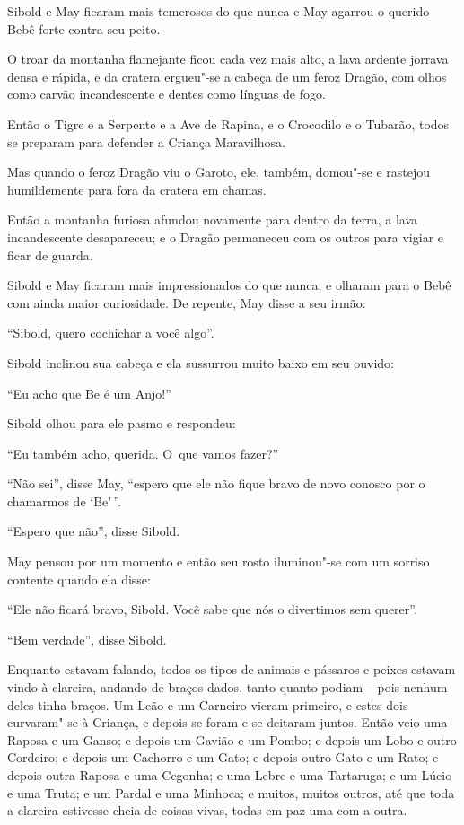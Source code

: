 Sibold e May ficaram mais temerosos do que nunca e May agarrou o querido
Bebê forte contra seu peito.

O troar da montanha flamejante ficou cada vez mais alto, a lava ardente
jorrava densa e rápida, e da cratera ergueu"-se a cabeça de um feroz
Dragão, com olhos como carvão incandescente e dentes como línguas de
fogo.

Então o Tigre e a Serpente e a Ave de Rapina, e o Crocodilo e o Tubarão,
todos se preparam para defender a Criança Maravilhosa.

Mas quando o feroz Dragão viu o Garoto, ele, também, domou"-se e rastejou
humildemente para fora da cratera em chamas.

Então a montanha furiosa afundou novamente para dentro da terra, a lava
incandescente desapareceu; e o Dragão permaneceu com os outros para
vigiar e ficar de guarda.

Sibold e May ficaram mais impressionados do que nunca, e olharam para o
Bebê com ainda maior curiosidade. De repente, May disse a seu irmão:

``Sibold, quero cochichar a você algo''.

Sibold inclinou sua cabeça e ela sussurrou muito baixo em seu ouvido:

``Eu acho que Be é um Anjo!''

Sibold olhou para ele pasmo e respondeu:

``Eu também acho, querida. O~que vamos fazer?''

``Não sei'', disse May, ``espero que ele não fique bravo de novo conosco
por o chamarmos de `Be'\,''.

``Espero que não'', disse Sibold.

May pensou por um momento e então seu rosto iluminou"-se com um sorriso
contente quando ela disse:

``Ele não ficará bravo, Sibold. Você sabe que nós o divertimos sem
querer''.

``Bem verdade'', disse Sibold.

Enquanto estavam falando, todos os tipos de animais e pássaros e peixes
estavam vindo à clareira, andando de braços dados, tanto quanto podiam
-- pois nenhum deles tinha braços. Um Leão e um Carneiro vieram
primeiro, e estes dois curvaram"-se à Criança, e depois se foram e se
deitaram juntos. Então veio uma Raposa e um Ganso; e depois um Gavião e
um Pombo; e depois um Lobo e outro Cordeiro; e depois um Cachorro e um
Gato; e depois outro Gato e um Rato; e depois outra Raposa e uma
Cegonha; e uma Lebre e uma Tartaruga; e um Lúcio e uma Truta; e um
Pardal e uma Minhoca; e muitos, muitos outros, até que toda a clareira
estivesse cheia de coisas vivas, todas em paz uma com a outra.

